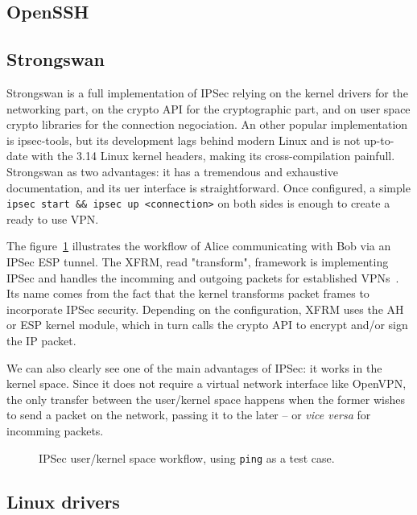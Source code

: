 \subsection{OpenSSH}


\subsection{Strongswan}
Strongswan is a full implementation of IPSec relying on the kernel drivers for the networking part, on the crypto API for the cryptographic part, and on user space crypto libraries for the connection negociation.
An other popular implementation is ipsec-tools, but its development lags behind modern Linux and is not up-to-date with the 3.14 Linux kernel headers, making its cross-compilation painfull.
Strongswan as two advantages: it has a tremendous and exhaustive documentation, and its uer interface is straightforward.
Once configured, a simple \texttt{ipsec start \&\& ipsec up <connection>} on both sides is enough to create a ready to use VPN.

The figure~\ref{fig:ipsec-workflow} illustrates the workflow of Alice communicating with Bob via an IPSec ESP tunnel.
The XFRM, read "transform", framework is implementing IPSec and handles the incomming and outgoing packets for established VPNs~\cite{rosen2014}.
Its name comes from the fact that the kernel transforms packet frames to incorporate IPSec security.
Depending on the configuration, XFRM uses the AH or ESP kernel module, which in turn calls the crypto API to encrypt and/or sign the IP packet.

We can also clearly see one of the main advantages of IPSec: it works in the kernel space.
Since it does not require a virtual network interface like OpenVPN, the only transfer between the user/kernel space happens when the former wishes to send a packet on the network, passing it to the later -- or \textit{vice versa} for incomming packets.

\begin{figure}[ht]
\Large
\resizebox{\linewidth}{!}{%

}
\caption{IPSec user/kernel space workflow, using \texttt{ping} as a test case.}{}
\label{fig:ipsec-workflow}
\end{figure}


\subsection{Linux drivers}

